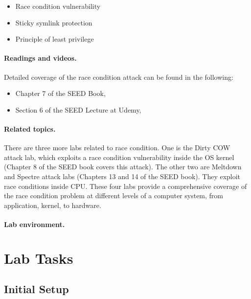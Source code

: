 \begin{itemize}[noitemsep]
\item Race condition vulnerability
\item Sticky symlink protection
\item Principle of least privilege
\end{itemize}




\paragraph{Readings and videos.}
Detailed coverage of the race condition attack can be found in the following:

\begin{itemize}
\item Chapter 7 of the SEED Book, \seedbook
\item Section 6 of the SEED Lecture at Udemy, \seedcsvideo
\end{itemize}


\paragraph{Related topics.}
There are three more labs related to race condition. One 
is the Dirty COW attack lab, which exploits a race condition vulnerability
inside the OS kernel (Chapter 8 of the SEED book covers this attack).
The other two are Meltdown and Spectre attack labs (Chapters 13 and 14 
of the SEED book). They exploit 
race conditions inside CPU. These four labs provide 
a comprehensive coverage of the race condition problem at 
different levels of a computer system, from application, kernel, 
to hardware. 


\paragraph{Lab environment.} \seedenvironmentB


\section{Lab Tasks}


\subsection{Initial Setup}

